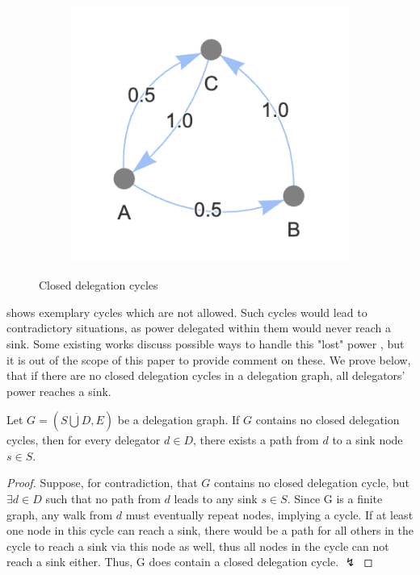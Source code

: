 \begin{figure}[h]
\begin{subfigure}[t]{0.32\textwidth}
    \end{subfigure}
    \hfill
    \begin{subfigure}[t]{0.32\textwidth}
        \centering
        \includegraphics[width=\textwidth]{invalid_graph_3}
    \end{subfigure}
    \caption{Closed delegation cycles}
    \label{fig:closed-delegation-cycles}
\end{figure}

 shows exemplary cycles which are not allowed. Such cycles would lead to contradictory situations, as power delegated within them would never reach a sink. Some existing works discuss possible ways to handle this "lost" power \cite{behrensCircularDelegationsMyth2015, brillInteractiveDemocracy2018}, but it is out of the scope of this paper to provide comment on these. We prove below, that if there are no closed delegation cycles in a delegation graph, all delegators' power reaches a sink.

\begin{theorem}
Let $G = (S \dot\bigcup D, E)$ be a delegation graph. If $G$ contains no closed delegation cycles, then for every delegator $d \in D$, there exists a path from $d$ to a sink node $s \in S$.
\end{theorem}
\begin{proof}
Suppose, for contradiction, that $G$ contains no closed delegation cycle, but $\exists d \in D$ such that no path from $d$ leads to any sink $s \in S$. Since G is a finite graph, any walk from $d$ must eventually repeat nodes, implying a cycle. If at least one node in this cycle can reach a sink, there would be a path for all others in the cycle to reach a sink via this node as well, thus all nodes in the cycle can not reach a sink either. Thus, G does contain a closed delegation cycle. $\lightning$
\end{proof}

